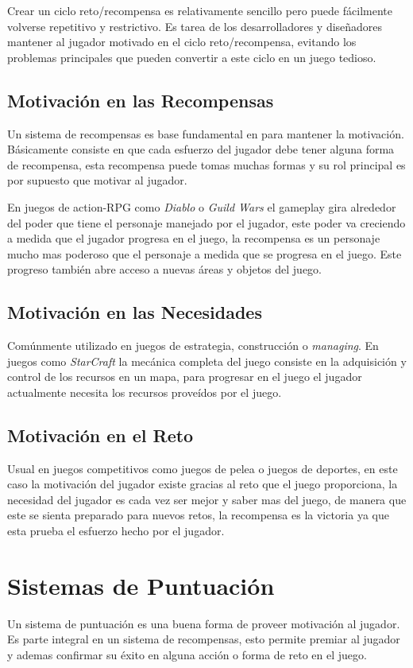 Crear un ciclo reto/recompensa es relativamente sencillo pero puede fácilmente volverse repetitivo y restrictivo. Es tarea de los desarrolladores y diseñadores mantener al jugador motivado en el ciclo reto/recompensa, evitando los problemas principales que pueden convertir a este ciclo en un juego tedioso.
\subsection{Motivación en las Recompensas}
Un sistema de recompensas es base fundamental en para mantener la motivación. Básicamente consiste en que cada esfuerzo del jugador debe tener alguna forma de recompensa, esta recompensa puede tomas muchas formas y su rol principal es por supuesto que motivar al jugador.

En juegos de action-RPG como \emph{Diablo} \cite{diablo} o \emph{Guild Wars} \cite{guildwars} el gameplay gira alrededor del poder que tiene el personaje manejado por el jugador, este poder va creciendo a medida que el jugador progresa en el juego, la recompensa es un personaje mucho mas poderoso que el personaje a medida que se progresa en el juego. Este progreso también abre acceso a nuevas áreas y objetos del juego.
\subsection{Motivación en las Necesidades}
Comúnmente utilizado en juegos de estrategia, construcción o \emph{managing}. En juegos como \emph{StarCraft} \cite{starcraft} la mecánica completa del juego consiste en la adquisición y control de los recursos en un mapa, para progresar en el juego el jugador actualmente necesita los recursos proveídos por el juego.
\subsection{Motivación en el Reto}
Usual en juegos competitivos como juegos de pelea o juegos de deportes, en este caso la motivación del jugador existe gracias al reto que el juego proporciona, la necesidad del jugador es cada vez ser mejor y saber mas del juego, de manera que este se sienta preparado para nuevos retos, la recompensa es la victoria ya que esta prueba el esfuerzo hecho por el jugador.
\section{Sistemas de Puntuación}
Un sistema de puntuación es una buena forma de proveer motivación al jugador.  Es parte integral en un sistema de recompensas, esto permite premiar al jugador y ademas confirmar su éxito en alguna acción o forma de reto en el juego.

